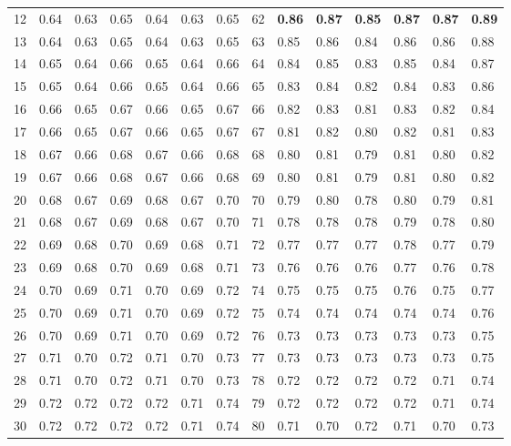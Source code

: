 \documentclass[11pt,a4paper]{article}
\begin{document}
\begin{table}[htbp]
\begin{tabular}{rllllll@{\hspace{8pt}}rllllll}
12 & 0.64 & 0.63 & 0.65 & 0.64 & 0.63 & 0.65 & 62 & \textbf{0.86} & \textbf{0.87} & \textbf{0.85} & \textbf{0.87} & \textbf{0.87} & \textbf{0.89} \\
13 & 0.64 & 0.63 & 0.65 & 0.64 & 0.63 & 0.65 & 63 & 0.85 & 0.86 & 0.84 & 0.86 & 0.86 & 0.88 \\
14 & 0.65 & 0.64 & 0.66 & 0.65 & 0.64 & 0.66 & 64 & 0.84 & 0.85 & 0.83 & 0.85 & 0.84 & 0.87 \\
15 & 0.65 & 0.64 & 0.66 & 0.65 & 0.64 & 0.66 & 65 & 0.83 & 0.84 & 0.82 & 0.84 & 0.83 & 0.86 \\
16 & 0.66 & 0.65 & 0.67 & 0.66 & 0.65 & 0.67 & 66 & 0.82 & 0.83 & 0.81 & 0.83 & 0.82 & 0.84 \\
17 & 0.66 & 0.65 & 0.67 & 0.66 & 0.65 & 0.67 & 67 & 0.81 & 0.82 & 0.80 & 0.82 & 0.81 & 0.83 \\
18 & 0.67 & 0.66 & 0.68 & 0.67 & 0.66 & 0.68 & 68 & 0.80 & 0.81 & 0.79 & 0.81 & 0.80 & 0.82 \\
19 & 0.67 & 0.66 & 0.68 & 0.67 & 0.66 & 0.68 & 69 & 0.80 & 0.81 & 0.79 & 0.81 & 0.80 & 0.82 \\
20 & 0.68 & 0.67 & 0.69 & 0.68 & 0.67 & 0.70 & 70 & 0.79 & 0.80 & 0.78 & 0.80 & 0.79 & 0.81 \\
21 & 0.68 & 0.67 & 0.69 & 0.68 & 0.67 & 0.70 & 71 & 0.78 & 0.78 & 0.78 & 0.79 & 0.78 & 0.80 \\
22 & 0.69 & 0.68 & 0.70 & 0.69 & 0.68 & 0.71 & 72 & 0.77 & 0.77 & 0.77 & 0.78 & 0.77 & 0.79 \\
23 & 0.69 & 0.68 & 0.70 & 0.69 & 0.68 & 0.71 & 73 & 0.76 & 0.76 & 0.76 & 0.77 & 0.76 & 0.78 \\
24 & 0.70 & 0.69 & 0.71 & 0.70 & 0.69 & 0.72 & 74 & 0.75 & 0.75 & 0.75 & 0.76 & 0.75 & 0.77 \\
25 & 0.70 & 0.69 & 0.71 & 0.70 & 0.69 & 0.72 & 75 & 0.74 & 0.74 & 0.74 & 0.74 & 0.74 & 0.76 \\
26 & 0.70 & 0.69 & 0.71 & 0.70 & 0.69 & 0.72 & 76 & 0.73 & 0.73 & 0.73 & 0.73 & 0.73 & 0.75 \\
27 & 0.71 & 0.70 & 0.72 & 0.71 & 0.70 & 0.73 & 77 & 0.73 & 0.73 & 0.73 & 0.73 & 0.73 & 0.75 \\
28 & 0.71 & 0.70 & 0.72 & 0.71 & 0.70 & 0.73 & 78 & 0.72 & 0.72 & 0.72 & 0.72 & 0.71 & 0.74 \\
29 & 0.72 & 0.72 & 0.72 & 0.72 & 0.71 & 0.74 & 79 & 0.72 & 0.72 & 0.72 & 0.72 & 0.71 & 0.74 \\
30 & 0.72 & 0.72 & 0.72 & 0.72 & 0.71 & 0.74 & 80 & 0.71 & 0.70 & 0.72 & 0.71 & 0.70 & 0.73 \\

\end{tabular}
\end{table}
\end{document}

